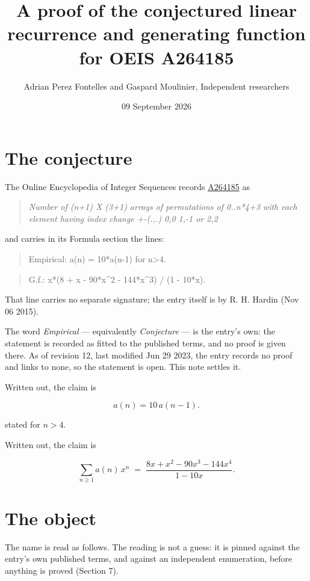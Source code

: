 \documentclass[11pt]{article}
\title{A proof of the conjectured linear recurrence and generating function for OEIS A264185}
\author{Adrian Perez Fontelles and Gaspard Moulinier, Independent researchers}
\date{09 September 2026}
\theoremstyle{definition}
\begin{document}
\maketitle
\section{The conjecture}

The Online Encyclopedia of Integer Sequences records \href{https://oeis.org/A264185}{A264185} as

\begin{quote}\itshape Number of (n+1) X (3+1) arrays of permutations of 0..n*4+3 with each element having index change +-(.,.) 0,0 1,-1 or 2,2\end{quote}

and carries in its Formula section the lines:

\begin{quote}\ttfamily Empirical: a(n) = 10*a(n-1) for n>4.\end{quote}

\begin{quote}\ttfamily G.f.: x*(8 + x - 90*x\textasciicircum{}2 - 144*x\textasciicircum{}3) / (1 - 10*x).\end{quote}

That line carries no separate signature; the entry itself is by R. H. Hardin (Nov 06 2015).

The word {\itshape Empirical} --- equivalently {\itshape Conjecture} --- is the entry's own: the statement is recorded as fitted to the published terms, and no proof is given there. As of revision 12, last modified Jun 29 2023, the entry records no proof and links to none, so the statement is open. This note settles it.

Written out, the claim is

\[a(n) = 10\,a(n-1).\]

stated for $n > 4$.

Written out, the claim is

\[\sum_{n \ge 1} a(n)\,x^n \;=\; \frac{8x + x^{2} - 90x^{3} - 144x^{4}}{1 - 10x}.\]

\section{The object}

The name is read as follows. The reading is not a guess: it is pinned against the entry's own published terms, and against an independent enumeration, before anything is proved (Section 7).
\end{document}
